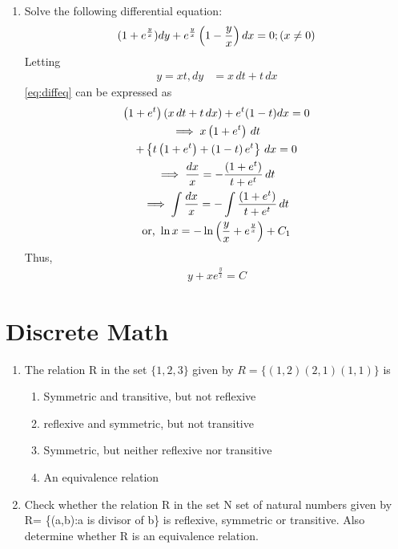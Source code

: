 \documentclass[journal,12pt,twocolumn]{IEEEtran}
\renewcommand\thesection{\arabic{section}}
\begin{document}
\begin{enumerate}[label=\thesection.\arabic*.,ref=\thesection.\theenumi]
\item Solve the following differential equation:
	\begin{align}
		\label{eq:diffeq}
		(1+e^{\frac{y}{x}}) dy+e^{\frac{y}{x}}\left(1-\frac{y}{x}\right) dx = 0 ; (x \ne 0) 
	\end{align}
\solution  Letting
	\begin{align}
		y = xt, dy &= x\,dt + t\, dx
	\end{align}
		\eqref{eq:diffeq}
 can be expressed as
	\begin{multline}
		\left(1+e^{t}\right)\left(x\,dt + t\, dx\right) +e^{t}(1-t) dx = 0 
		\\
		\implies x\left(1+e^{t}\right)\,dt 
		\\
		+ \left\{t\left(1+e^{t}\right)+\left(1-t\right)e^t \right\}\,dx = 0
		\\
		\implies \frac{dx}{x} = - \frac{\left(1+e^{t}\right)}{t+e^t}\,dt 
		\\
		\implies 
		\int\frac{dx}{x} = - \int\frac{\left(1+e^{t}\right)}{t+e^t}\,dt 
		\\
		\text{or, }\ln x = -\ln \left(\frac{y}{x}+e^{\frac{y}{x}}\right)+C_1
	\end{multline}
	Thus, 
	\begin{align}
y+xe^{\frac{y}{x}} = C
	\end{align}

\end{enumerate}
 \section{Discrete Math }
\begin{enumerate}[label=\thesection.\arabic*.,ref=\thesection.\theenumi]
\item  The relation R in the set $ \{1,2,3\}$  given by $R=\{(1,2)(2,1)(1,1)\}$ is

\begin{enumerate}
    \item Symmetric and transitive, but not reflexive  \\
    \item reflexive and symmetric, but not transitive  \\
    \item Symmetric, but neither reflexive nor transitive \\
    \item An equivalence relation 
\end{enumerate}
  \item Check whether the relation R in the set N set of natural numbers given by R= \{(a,b):a is divisor of b\} is reflexive, symmetric or transitive. Also determine whether R is an equivalence relation. 
\end{enumerate}
\end{document}
